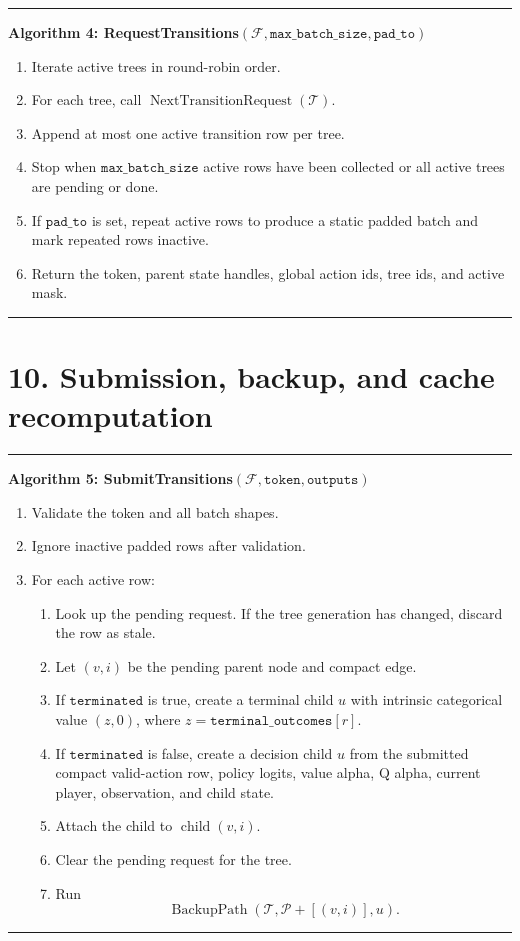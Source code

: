 \documentclass[11pt]{article}
\newcommand{\Forest}{\mathcal{F}}
\newcommand{\Tree}{\mathcal{T}}
\newcommand{\Path}{\mathcal{P}}
\newcommand{\Child}{\operatorname{child}}
\newcommand{\BackupPath}{\operatorname{BackupPath}}
\newcommand{\NextTransitionRequest}{\operatorname{NextTransitionRequest}}
\newenvironment{algorithmblock}[1]
{
  \par\medskip
  \noindent\hrule\par\smallskip
  \noindent\textbf{#1}
  \par\smallskip
}
{
  \par\smallskip\noindent\hrule\par\medskip
}
\begin{document}
\begin{algorithmblock}{Algorithm 4: RequestTransitions\((\Forest,\texttt{max\_batch\_size},\texttt{pad\_to})\)}

\begin{enumerate}[leftmargin=2em]
  \item Iterate active trees in round-robin order.
  \item For each tree, call \(\NextTransitionRequest(\Tree)\).
  \item Append at most one active transition row per tree.
  \item Stop when \(\texttt{max\_batch\_size}\) active rows have been collected
  or all active trees are pending or done.
  \item If \(\texttt{pad\_to}\) is set, repeat active rows to produce a static
  padded batch and mark repeated rows inactive.
  \item Return the token, parent state handles, global action ids, tree ids, and
  active mask.
\end{enumerate}

\end{algorithmblock}

\section*{10. Submission, backup, and cache recomputation}

\begin{algorithmblock}{Algorithm 5: SubmitTransitions\((\Forest,\texttt{token},\texttt{outputs})\)}

\begin{enumerate}[leftmargin=2em]
  \item Validate the token and all batch shapes.
  \item Ignore inactive padded rows after validation.
  \item For each active row:
  \begin{enumerate}[leftmargin=2em]
    \item Look up the pending request. If the tree generation has changed,
    discard the row as stale.
    \item Let \((v,i)\) be the pending parent node and compact edge.
    \item If \(\texttt{terminated}\) is true, create a terminal child \(u\) with
    intrinsic categorical value \((z,0)\), where
    \(z=\texttt{terminal\_outcomes}[r]\).
    \item If \(\texttt{terminated}\) is false, create a decision child \(u\) from
    the submitted compact valid-action row, policy logits, value alpha, Q alpha,
    current player, observation, and child state.
    \item Attach the child to \(\Child(v,i)\).
    \item Clear the pending request for the tree.
    \item Run
    \[
    \BackupPath(\Tree,\Path\mathbin{+}[(v,i)],u).
    \]
  \end{enumerate}
\end{enumerate}

\end{algorithmblock}
\end{document}
